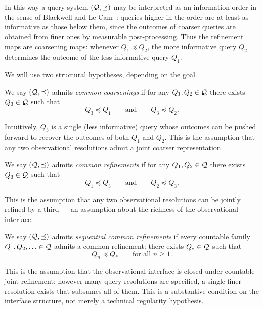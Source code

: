 In this way a query system $(\mathcal{Q},\preceq)$ may be interpreted as an
information order in the sense of Blackwell and Le Cam~\cite{Blackwell,LeCam}:
queries higher in the order are at least as informative as those below
them, since the outcomes of coarser queries are obtained from finer ones
by measurable post-processing.  Thus the refinement maps are coarsening
maps: whenever $Q_1 \preceq Q_2$, the more informative query $Q_2$
determines the outcome of the less informative query $Q_1$.

We will use two structural hypotheses, depending on the goal.

\begin{definition}
\label{def:lower-directed}
We say $(\mathcal{Q},\preceq)$ admits \emph{common coarsenings} if for any $Q_1,Q_2\in\mathcal{Q}$
there exists $Q_3\in\mathcal{Q}$ such that
\[
Q_3 \preceq Q_1
\qquad\text{and}\qquad
Q_3 \preceq Q_2 .
\]
\end{definition}

Intuitively, $Q_3$ is a single (less informative) query whose outcomes can be
pushed forward to recover the outcomes of both $Q_1$ and $Q_2$. This
is the assumption that any two observational resolutions admit a joint
coarser representation.

\begin{definition}
\label{def:upper-directed}
We say $(\mathcal{Q},\preceq)$ admits \emph{common refinements} if for any $Q_1,Q_2\in\mathcal{Q}$
there exists $Q_3\in\mathcal{Q}$ such that
\[
Q_1 \preceq Q_3
\qquad\text{and}\qquad
Q_2 \preceq Q_3 .
\]
\end{definition}

This is the assumption that any two observational resolutions can be
jointly refined by a third --- an assumption about the richness of the
observational interface.

\begin{definition}
\label{def:seq-upper-directed}
We say $(\mathcal{Q},\preceq)$ admits \emph{sequential common refinements} if every
countable family $Q_1, Q_2, \ldots \in \mathcal{Q}$ admits a common refinement: there exists
$Q_*\in\mathcal{Q}$ such that
\[
Q_n \preceq Q_*
\qquad\text{for all } n \ge 1.
\]
\end{definition}

This is the assumption that the observational interface is closed
under countable joint refinement: however many query resolutions are
specified, a single finer resolution exists that subsumes all of them.
This is a substantive condition on the interface structure, not merely
a technical regularity hypothesis.

